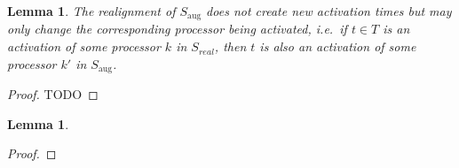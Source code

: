 \documentclass[a4paper]{article}
\DeclareMathOperator{\aug}{aug}
\newtheorem{lemma}[theorem]{Lemma}
\begin{document}
\begin{lemma}
  The realignment of $S_{\aug}$ does not create new activation times but may only change the corresponding processor being activated, i.e.\ if $t \in T$ is an activation of some processor $k$ in $S_{real}$, then $t$ is also an activation of some processor $k'$ in $S_{\aug}$.
\end{lemma}
\begin{proof}
  TODO
\end{proof}
\begin{lemma}\label{lemma:constellation}

\end{lemma}
\begin{proof}
\end{proof}



%


\end{document}
